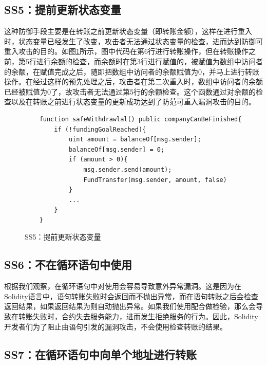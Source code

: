 \subsection{SS5：提前更新状态变量}
这种防御手段主要是在转账之前更新状态变量（即转账金额），这样在进行重入时，状态变量已经发生了改变，攻击者无法通过状态变量的检查，进而达到防御可重入攻击的目的。如图\ref{fig:ss5_example}所示，图中代码在第6行进行转账操作，但在转账操作之前，第5行进行余额的检查，而余额时在第3行进行赋值的，被赋值为数组中访问者的余额，在赋值完成之后，随即把数组中访问者的余额赋值为0，并马上进行转账操作。在经过这样的预先处理之后，攻击者在第二次重入时，数组中访问者的余额已经被赋值为0了，故攻击者无法通过第5行的余额检查。这个函数通过对余额的检查以及在转账之前进行状态变量的更新成功达到了防范可重入漏洞攻击的目的。
\begin{figure}
\begin{minipage}[htbp]{1.0\linewidth}
    \begin{lstlisting}
    function safeWithdrawlal() public companyCanBeFinished{
        if (!fundingGoalReached){
            uint amount = balanceOf[msg.sender];
            balanceOf[msg.sender] = 0;
            if (amount > 0){
                msg.sender.send(amount);
                FundTransfer(msg.sender, amount, false)
            }
            ...
        }
    }
    \end{lstlisting}
\end{minipage}
\vspace{-5mm}
\caption{SS5：提前更新状态变量}
\label{fig:ss5_example}
\end{figure}

\subsection{SS6：不在循环语句中使用}

根据我们观察，在循环语句中对使用会容易导致意外异常漏洞。这是因为在Solidity语言中，语句转账失败时会返回而不抛出异常，而在语句转账之后会检查返回结果，如果返回结果为则自动抛出异常。如果我们使用配合做检验，那么会导致在转账失败时，合约失去服务能力，进而发生拒绝服务的行为。因此，Solidity开发者们为了阻止由语句引发的漏洞攻击，不会使用检查转账的结果。

\subsection{SS7：在循环语句中向单个地址进行转账}


